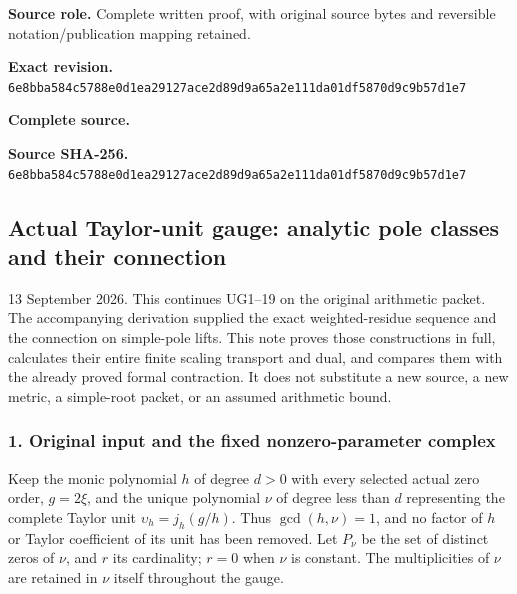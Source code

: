 \documentclass{article}
\begin{document}
\maketitle
\begingroup
\sloppy
\small

\noindent\textbf{Source role.} Complete written proof, with original source bytes and reversible notation/publication mapping retained.\par
\noindent\textbf{Exact revision.} \nolinkurl{6e8bba584c5788e0d1ea29127ace2d89d9a65a2e111da01df5870d9c9b57d1e7}\par
\noindent\textbf{Complete source.} \par
\noindent\textbf{Source SHA-256.} \nolinkurl{6e8bba584c5788e0d1ea29127ace2d89d9a65a2e111da01df5870d9c9b57d1e7}\par\medskip
\subsection{Actual Taylor-unit gauge: analytic pole classes and their connection}\label{endpoint-analytic_pole--actual-taylor-unit-gauge-analytic-pole-classes-and-their-connection}

13 September 2026. This continues UG1--19 on the original arithmetic packet. The accompanying derivation supplied the exact weighted-residue sequence and the connection on simple-pole lifts. This note proves those constructions in full, calculates their entire finite scaling transport and dual, and compares them with the already proved formal contraction. It does not substitute a new source, a new metric, a simple-root packet, or an assumed arithmetic bound.

\subsubsection{1. Original input and the fixed nonzero-parameter complex}\label{endpoint-analytic_pole--original-input-and-the-fixed-nonzero-parameter-complex}

Keep the monic polynomial \(h\) of degree \(d>0\) with every selected actual zero order, \(g=2\xi\), and the unique polynomial \(\nu\) of degree less than \(d\) representing the complete Taylor unit \(\upsilon_h=j_h(g/h)\). Thus \(\gcd(h,\nu)=1\), and no factor of \(h\) or Taylor coefficient of its unit has been removed. Let \(P_{\nu}\) be the set of distinct zeros of \(\nu\), and \(r\) its cardinality; \(r=0\) when \(\nu\) is constant. The multiplicities of \(\nu\) are retained in \(\nu\) itself throughout the gauge.
\end{document}
